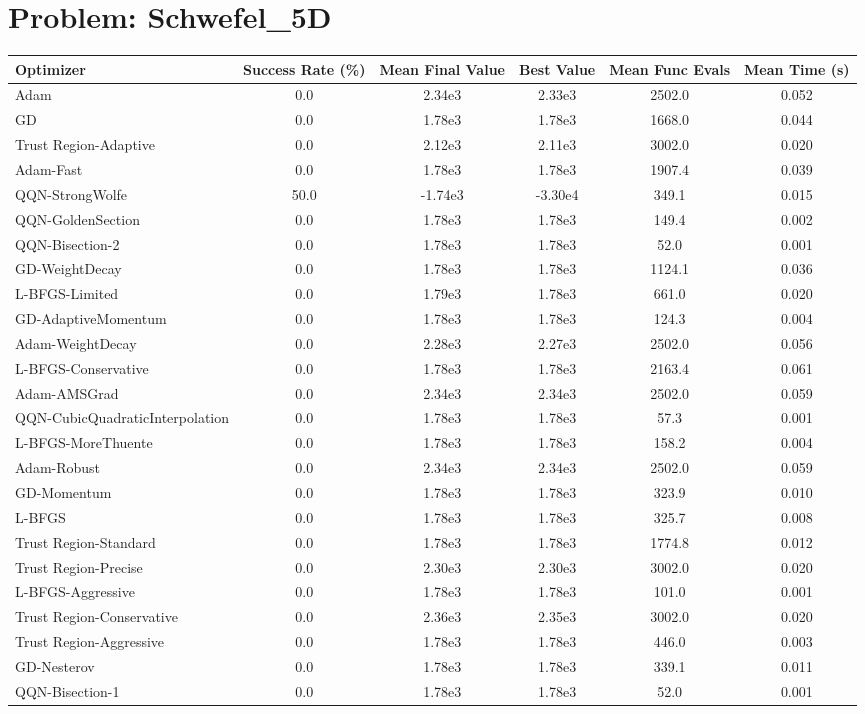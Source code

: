 \documentclass{article}
\begin{document}
\section{Problem: Schwefel\_5D}
\begin{longtable}{p{3cm}*{5}{c}}
\toprule
\textbf{Optimizer} & \textbf{Success Rate (\%)} & \textbf{Mean Final Value} & \textbf{Best Value} & \textbf{Mean Func Evals} & \textbf{Mean Time (s)} \\
\midrule
Adam & 0.0 & 2.34e3 & 2.33e3 & 2502.0 & 0.052 \\
GD & 0.0 & 1.78e3 & 1.78e3 & 1668.0 & 0.044 \\
Trust Region-Adaptive & 0.0 & 2.12e3 & 2.11e3 & 3002.0 & 0.020 \\
Adam-Fast & 0.0 & 1.78e3 & 1.78e3 & 1907.4 & 0.039 \\
QQN-StrongWolfe & 50.0 & -1.74e3 & -3.30e4 & 349.1 & 0.015 \\
QQN-GoldenSection & 0.0 & 1.78e3 & 1.78e3 & 149.4 & 0.002 \\
QQN-Bisection-2 & 0.0 & 1.78e3 & 1.78e3 & 52.0 & 0.001 \\
GD-WeightDecay & 0.0 & 1.78e3 & 1.78e3 & 1124.1 & 0.036 \\
L-BFGS-Limited & 0.0 & 1.79e3 & 1.78e3 & 661.0 & 0.020 \\
GD-AdaptiveMomentum & 0.0 & 1.78e3 & 1.78e3 & 124.3 & 0.004 \\
Adam-WeightDecay & 0.0 & 2.28e3 & 2.27e3 & 2502.0 & 0.056 \\
L-BFGS-Conservative & 0.0 & 1.78e3 & 1.78e3 & 2163.4 & 0.061 \\
Adam-AMSGrad & 0.0 & 2.34e3 & 2.34e3 & 2502.0 & 0.059 \\
QQN-CubicQuadraticInterpolation & 0.0 & 1.78e3 & 1.78e3 & 57.3 & 0.001 \\
L-BFGS-MoreThuente & 0.0 & 1.78e3 & 1.78e3 & 158.2 & 0.004 \\
Adam-Robust & 0.0 & 2.34e3 & 2.34e3 & 2502.0 & 0.059 \\
GD-Momentum & 0.0 & 1.78e3 & 1.78e3 & 323.9 & 0.010 \\
L-BFGS & 0.0 & 1.78e3 & 1.78e3 & 325.7 & 0.008 \\
Trust Region-Standard & 0.0 & 1.78e3 & 1.78e3 & 1774.8 & 0.012 \\
Trust Region-Precise & 0.0 & 2.30e3 & 2.30e3 & 3002.0 & 0.020 \\
L-BFGS-Aggressive & 0.0 & 1.78e3 & 1.78e3 & 101.0 & 0.001 \\
Trust Region-Conservative & 0.0 & 2.36e3 & 2.35e3 & 3002.0 & 0.020 \\
Trust Region-Aggressive & 0.0 & 1.78e3 & 1.78e3 & 446.0 & 0.003 \\
GD-Nesterov & 0.0 & 1.78e3 & 1.78e3 & 339.1 & 0.011 \\
QQN-Bisection-1 & 0.0 & 1.78e3 & 1.78e3 & 52.0 & 0.001 \\
\bottomrule
\end{longtable}
\end{document}
